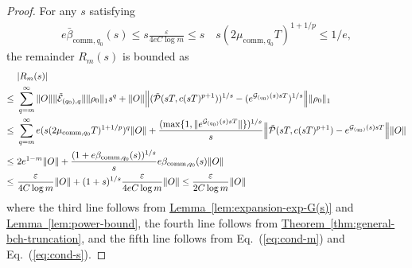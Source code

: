 \documentclass[11pt]{article}
\newcommand{\eq}[1]{(\ref{eq:#1})}
\newcommand{\thm}[1]{\hyperref[thm:#1]{Theorem~\ref*{thm:#1}}}
\newcommand{\lem}[1]{\hyperref[lem:#1]{Lemma~\ref*{lem:#1}}}
\newcommand{\G}{\mathcal{G}}
\newcommand{\E}{\mathcal{E}}
\newcommand{\eps}{\varepsilon}
\newcommand{\mc}{\mathcal}
\begin{document}
\begin{proof}
   
    For any $s$ satisfying \begin{align}
    \label{eq:cond-s}
        e\bar\beta_{\mathrm{comm},q_0}(s)\le s\frac{\eps}{4eC \log m} \le s \quad s(2\mu_{\mathrm{comm},q_0}T)^{1+1/p} \le 1/e,
    \end{align} the remainder $R_m(s)$ is bounded as \begin{align*}
        &|R_m(s)| \\
        \le ~&\sum_{q=m}^{\infty}\|O\|\|\tilde{\E}_{(q_0),q}\|\|\rho_0\|_1 s^q + \|O\|\Big\|(\tilde{\mc P}(sT, c(sT)^{p+1}))^{1/s}-(e^{\G_{(q_0)}(s)sT})^{1/s}\Big\|\|\rho_0\|_1 \\
        \le ~& \sum_{q=m}^{\infty} e(s(2\mu_{\mathrm{comm},q_0} T)^{1+1/p})^{q}\|O\|+\frac{(\max\{1, \|e^{\G_{(q_0)}(s) sT}\|\})^{1/s}}{s}\Bigl\|\tilde{\mc P}(sT, c(sT)^{p+1})-e^{\G_{(q_0)}(s)sT}\Bigr\|\|O\|\\
        \le ~&2e^{1-m} \|O\|+ \frac{(1+e\beta_{\mathrm{comm},q_0}(s))^{1/s}}{s}e\beta_{\mathrm{comm},q_0}(s)\|O\| \\
        \le ~& \frac{\eps}{4C\log m} \|O\|+(1+s)^{1/s}\frac{\eps}{4eC\log m}\|O\| \le \frac{\eps}{2C\log m} \|O\|
    \end{align*}
    where the third line follows from \lem{expansion-exp-G(s)} and \lem{power-bound}, the fourth line follows from 
    \thm{general-bch-truncation}, and the fifth line follows from Eq.~\eq{cond-m} and Eq.~\eq{cond-s}.
    

\end{proof}
\end{document}
